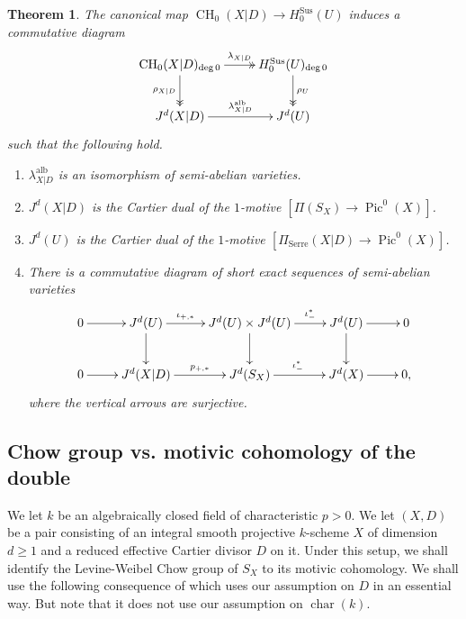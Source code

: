 \documentclass[11pt]{article}
\numberwithin{equation}{section}
\newcommand{\alb}{\mathrm{alb}}
\newcommand{\Serre}{\mathrm{Serre}}
\newcommand{\sus}{\mathrm{Sus}}
\newtheorem{thm}{Theorem}[section]
\theoremstyle{definition}
\DeclareMathOperator{\CH}{CH}
\DeclareMathOperator{\Char}{char}
\DeclareMathOperator{\Pic}{Pic}
\begin{document}
\begin{thm}\label{thm:Semi-abl-Alb}
The canonical map $\CH_0(X|D) \to H^{\sus}_0(U)$ induces a commutative
diagram
\begin{equation}\label{eqn:doubl-ex-seq-*-0}
\begin{array}{c}
\xymatrix{
\CH_0(X|D)_{\deg 0} \ar@{->>}[r]^-{\lambda_{X|D}} \ar@{->>}[d]_{\rho_{X|D}} &
H^{\sus}_0(U)_{\deg 0} \ar@{->>}[d]^{\rho_U} \\
J^d(X|D) \ar[r]^-{\lambda^{\alb}_{X|D}} & J^d(U)}
\end{array}
\end{equation}
such that the following hold.
\begin{enumerate}
\item\label{thm:Semi-abl-Alb1}
$\lambda^{\alb}_{X|D}$ is an isomorphism of semi-abelian varieties.
\item\label{thm:Semi-abl-Alb2}
$J^d(X|D)$ is the Cartier dual of the $1$-motive
$[\Pi(S_X) \to \Pic^0(X)]$.
\item\label{thm:Semi-abl-Alb3}
$J^d(U)$ is the Cartier dual of the $1$-motive
$[\Pi_{\Serre}(X|D) \to \Pic^0(X)]$.
\item\label{thm:Semi-abl-Alb4}
There is a commutative diagram of short exact sequences of
semi-abelian varieties
\begin{equation}\label{eqn:doubl-ex-seq-*-1}
\begin{array}{c}
\xymatrix{
0 \ar[r] & J^d(U) \ar[r]^-{\iota_{+,*}} \ar[d] & J^d(U) \times J^d(U)
\ar[r]^-{\iota^*_-} \ar[d] & J^d(U) \ar[r] \ar[d] & 0 \\
0 \ar[r] & J^d(X|D) \ar[r]^-{p_{+,*}} & J^d(S_X) \ar[r]^{\iota^*_-} &
J^d(X) \ar[r] & 0,}
\end{array}
\end{equation}
where the vertical arrows are surjective.
\end{enumerate}
\end{thm}

\subsection{Chow group vs. motivic cohomology of the double}
\label{sec:Relation}
We let $k$ be an algebraically closed field of characteristic $p > 0$.
We let $(X,D)$ be a pair consisting of an integral smooth projective $k$-scheme $X$
of dimension $d\geq 1$ and a reduced effective Cartier divisor $D$ on it.
Under this setup, we shall identify the Levine-Weibel Chow group of $S_X$ to its
motivic cohomology.
We shall use the following consequence of \hbox{\cite[Th.\,6.5]{Krishna-2}}
which uses our assumption on $D$ in an essential way.
But note that it does not use our assumption on $\Char(k)$.
\end{document}
